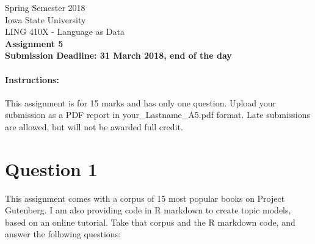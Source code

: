 \documentclass[11pt,a4paper]{article}
\begin{document}
\begin{center}
  Spring Semester 2018 \\ Iowa State University\\[3ex]
  {\large LING 410X - Language as Data}\\[3ex]
  \textbf{Assignment 5} \\ \textbf{Submission Deadline: 31 March 2018, end of the day}
\end{center}


\paragraph{Instructions:} This assignment is for 15 marks and has only one question. Upload your submission as a PDF report in your\_Lastname\_A5.pdf format. Late submissions are allowed, but will not be awarded full credit.

\section*{Question 1} 
This assignment comes with a corpus of 15 most popular books on Project Gutenberg. I am also providing code in R markdown to create topic models, based on an online tutorial. Take that corpus and the R markdown code, and answer the following questions:
\end{document}
